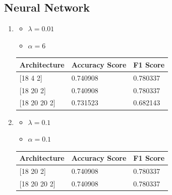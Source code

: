 \documentclass[letterpaper]{article}
\begin{document}
\subsection*{Neural Network}
\begin{enumerate}[label=(\alph*)]
	\item \begin{itemize}
		      \item $\lambda = 0.01$
		      \item $\alpha = 6$
	      \end{itemize}

	      \begin{table}[H]
		      \centering
		      \begin{tabular}{|l|l|l|}
			      \hline
			      Architecture     & Accuracy Score & F1 Score \\ \hline
			      {[}18 4 2{]}     & 0.740908       & 0.780337 \\ \hline
			      {[}18 20 2{]}    & 0.740908       & 0.780337 \\ \hline
			      {[}18 20 20 2{]} & 0.731523       & 0.682143 \\ \hline
		      \end{tabular}
	      \end{table}
	\item \begin{itemize}
		      \item $\lambda = 0.1$
		      \item $\alpha = 0.1$
	      \end{itemize}

	      \begin{table}[H]
		      \centering
		      \begin{tabular}{|l|l|l|}
			      \hline
			      Architecture     & Accuracy Score & F1 Score \\ \hline
			      {[}18 20 2{]}    & 0.740908       & 0.780337 \\ \hline
			      {[}18 20 20 2{]} & 0.740908       & 0.780337 \\ \hline
		      \end{tabular}
	      \end{table}
\end{enumerate}
\end{document}
